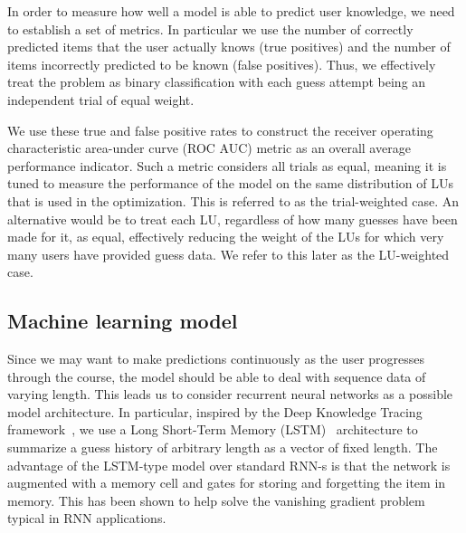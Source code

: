 In order to measure how well a model is able to predict user knowledge, we need to establish a set of metrics. In particular we use the number of correctly predicted items that the user actually knows (true positives) and the number of items incorrectly predicted to be known (false positives). Thus, we effectively treat the problem as binary classification with each guess attempt being an independent trial of equal weight.

We use these true and false positive rates to construct the receiver operating characteristic area-under curve (ROC AUC) metric as an overall average performance indicator. Such a metric considers all trials as equal, meaning it is tuned to measure the performance of the model on the same distribution of LUs that is used in the optimization. This is referred to as the trial-weighted case. An alternative would be to treat each LU, regardless of how many guesses have been made for it, as equal, effectively reducing the weight of the LUs for which very many users have provided guess data. We refer to this later as the LU-weighted case.

\subsection{Machine learning model}
\label{sec:nlp_model}
Since we may want to make predictions continuously as the user progresses through the course, the model should be able to deal with sequence data of varying length. This leads us to consider recurrent neural networks as a possible model architecture. In particular, inspired by the Deep Knowledge Tracing framework~\cite{DBLP:journals/corr/PiechSHGSGS15}, we use a Long Short-Term Memory (LSTM)~\cite{gers1999learning} architecture to summarize a guess history of arbitrary length as a vector of fixed length. The advantage of the LSTM-type model over standard RNN-s is that the network is augmented with a memory cell and gates for storing and forgetting the item in memory. This has been shown to help solve the vanishing gradient problem typical in RNN applications. 


